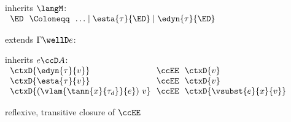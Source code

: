 \begin{flushleft}

 inherits $\langM$:\\
$\begin{array}{l@{~~}c@{~~}l}
  \ED & \Coloneqq & \ldots \mid \esta{\tau}{\ED} \mid \edyn{\tau}{\ED}
\end{array}$

\medskip
{} extends $\Gamma \wellD e$:
\begin{mathpar}


\end{mathpar}

\medskip
{} inherits $e \ccD A$:\\
$\begin{array}{l@{~~}c@{~~}l}
  \ctxD{\edyn{\tau}{v}} & \ccEE & \ctxD{v}
\\
  \ctxD{\esta{\tau}{v}} & \ccEE & \ctxD{v}
\\
  \ctxD{(\vlam{\tann{x}{\tau_d}}{e})~v} & \ccEE & \ctxD{\vsubst{e}{x}{v}}
\end{array}$

 reflexive, transitive closure of $\ccEE$

\end{flushleft}
